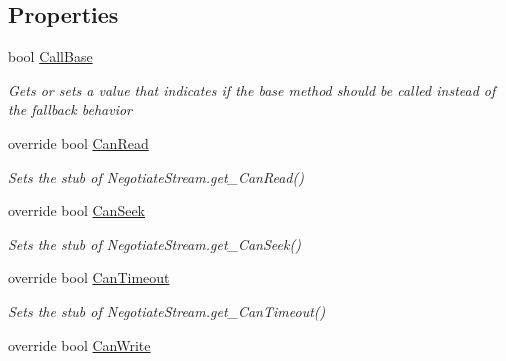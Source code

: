 \subsection*{Properties}
\begin{DoxyCompactItemize}
\item 
bool \hyperlink{class_system_1_1_net_1_1_security_1_1_fakes_1_1_stub_negotiate_stream_ab81b626b6aff6f037a8daaaab26b4709}{Call\-Base}
\begin{DoxyCompactList}\small\item\em Gets or sets a value that indicates if the base method should be called instead of the fallback behavior\end{DoxyCompactList}\item 
override bool \hyperlink{class_system_1_1_net_1_1_security_1_1_fakes_1_1_stub_negotiate_stream_a28d799ad0be97c18df065ef4b9f52169}{Can\-Read}
\begin{DoxyCompactList}\small\item\em Sets the stub of Negotiate\-Stream.\-get\-\_\-\-Can\-Read()\end{DoxyCompactList}\item 
override bool \hyperlink{class_system_1_1_net_1_1_security_1_1_fakes_1_1_stub_negotiate_stream_a62af6b2af529768ae3a7f6f51a632a5b}{Can\-Seek}
\begin{DoxyCompactList}\small\item\em Sets the stub of Negotiate\-Stream.\-get\-\_\-\-Can\-Seek()\end{DoxyCompactList}\item 
override bool \hyperlink{class_system_1_1_net_1_1_security_1_1_fakes_1_1_stub_negotiate_stream_a667fb5e76b4a76b4452f681b49d7b80c}{Can\-Timeout}
\begin{DoxyCompactList}\small\item\em Sets the stub of Negotiate\-Stream.\-get\-\_\-\-Can\-Timeout()\end{DoxyCompactList}\item 
override bool \hyperlink{class_system_1_1_net_1_1_security_1_1_fakes_1_1_stub_negotiate_stream_ae73dc9b22712fdf35b62ae2ded1c2627}{Can\-Write}

\end{DoxyCompactItemize}

